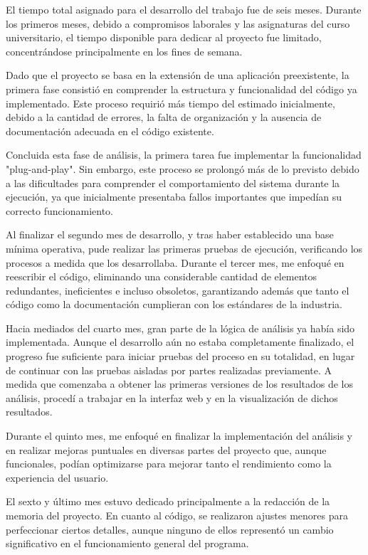 \documentclass[a4paper, 12pt]{book}
\begin{document}
El tiempo total asignado para el desarrollo del trabajo fue de seis meses. Durante los primeros meses, debido a compromisos laborales y las asignaturas del curso universitario, el tiempo disponible para dedicar al proyecto fue limitado, concentrándose principalmente en los fines de semana.

Dado que el proyecto se basa en la extensión de una aplicación preexistente, la primera fase consistió en comprender la estructura y funcionalidad del código ya implementado. Este proceso requirió más tiempo del estimado inicialmente, debido a la cantidad de errores, la falta de organización y la ausencia de documentación adecuada en el código existente.

Concluida esta fase de análisis, la primera tarea fue implementar la funcionalidad "plug-and-play". Sin embargo, este proceso se prolongó más de lo previsto debido a las dificultades para comprender el comportamiento del sistema durante la ejecución, ya que inicialmente presentaba fallos importantes que impedían su correcto funcionamiento.

Al finalizar el segundo mes de desarrollo, y tras haber establecido una base mínima operativa, pude realizar las primeras pruebas de ejecución, verificando los procesos a medida que los desarrollaba. Durante el tercer mes, me enfoqué en reescribir el código, eliminando una considerable cantidad de elementos redundantes, ineficientes e incluso obsoletos, garantizando además que tanto el código como la documentación cumplieran con los estándares de la industria.

Hacia mediados del cuarto mes, gran parte de la lógica de análisis ya había sido implementada. Aunque el desarrollo aún no estaba completamente finalizado, el progreso fue suficiente para iniciar pruebas del proceso en su totalidad, en lugar de continuar con las pruebas aisladas por partes realizadas previamente. A medida que comenzaba a obtener las primeras versiones de los resultados de los análisis, procedí a trabajar en la interfaz web y en la visualización de dichos resultados.

Durante el quinto mes, me enfoqué en finalizar la implementación del análisis y en realizar mejoras puntuales en diversas partes del proyecto que, aunque funcionales, podían optimizarse para mejorar tanto el rendimiento como la experiencia del usuario.

El sexto y último mes estuvo dedicado principalmente a la redacción de la memoria del proyecto. En cuanto al código, se realizaron ajustes menores para perfeccionar ciertos detalles, aunque ninguno de ellos representó un cambio significativo en el funcionamiento general del programa.
\end{document}
